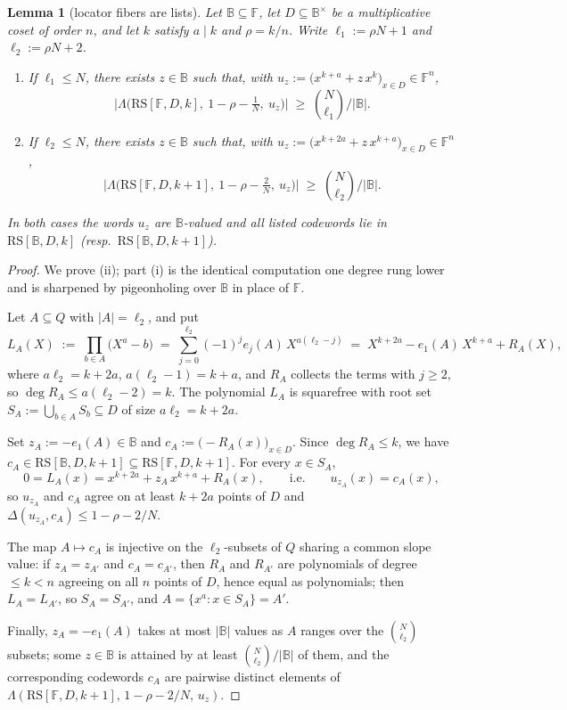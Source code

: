 \documentclass[11pt]{article}
\newtheorem{lemma}[lemma]{Lemma}
\theoremstyle{definition}
\theoremstyle{remark}
\newcommand{\F}{\mathbb{F}}
\newcommand{\B}{\mathbb{B}}
\newcommand{\RS}{\mathrm{RS}}
\newcommand{\dist}{\Delta}
\newcommand{\Lst}{\Lambda}
\begin{document}
\begin{lemma}[locator fibers are lists]\label{lem:fiber}
Let $\B\subseteq\F$, let $D\subseteq\B^\times$ be a multiplicative coset of order $n$, and let $k$ satisfy $a\mid k$ and $\rho=k/n$. Write $\ell_1:=\rho N+1$ and $\ell_2:=\rho N+2$.
\begin{enumerate}[label=\textup{(\roman*)}]
\item If $\ell_1\le N$, there exists $z\in\B$ such that, with $u_z:=\bigl(x^{k+a}+z\,x^{k}\bigr)_{x\in D}\in\F^n$,
\[
\bigl|\Lst\bigl(\RS[\F,D,k],\ 1-\rho-\tfrac1N,\ u_z\bigr)\bigr|\;\ge\;\binom{N}{\ell_1}\Big/|\B| .
\]
\item If $\ell_2\le N$, there exists $z\in\B$ such that, with $u_z:=\bigl(x^{k+2a}+z\,x^{k+a}\bigr)_{x\in D}\in\F^n$,
\[
\bigl|\Lst\bigl(\RS[\F,D,k+1],\ 1-\rho-\tfrac2N,\ u_z\bigr)\bigr|\;\ge\;\binom{N}{\ell_2}\Big/|\B| .
\]
\end{enumerate}
In both cases the words $u_z$ are $\B$-valued and all listed codewords lie in $\RS[\B,D,k]$ \textup(resp.\ $\RS[\B,D,k+1]$\textup).
\end{lemma}

\begin{proof}
We prove (ii); part (i) is the identical computation one degree rung lower and is \cite[Main Thm.\,(d)]{Cho26a} sharpened by pigeonholing over $\B$ in place of $\F$.

Let $A\subseteq Q$ with $|A|=\ell_2$, and put
\[
L_A(X)\;:=\;\prod_{b\in A}\bigl(X^a-b\bigr)\;=\;\sum_{j=0}^{\ell_2}(-1)^j e_j(A)\,X^{a(\ell_2-j)}\;=\;X^{k+2a}-e_1(A)\,X^{k+a}+R_A(X),
\]
where $a\ell_2=k+2a$, $a(\ell_2-1)=k+a$, and $R_A$ collects the terms with $j\ge2$, so $\deg R_A\le a(\ell_2-2)=k$. The polynomial $L_A$ is squarefree with root set $S_A:=\bigcup_{b\in A}S_b\subseteq D$ of size $a\ell_2=k+2a$.

Set $z_A:=-e_1(A)\in\B$ and $c_A:=\bigl(-R_A(x)\bigr)_{x\in D}$. Since $\deg R_A\le k$, we have $c_A\in\RS[\B,D,k+1]\subseteq\RS[\F,D,k+1]$. For every $x\in S_A$,
\[
0=L_A(x)=x^{k+2a}+z_A\,x^{k+a}+R_A(x),\qquad\text{i.e.}\qquad u_{z_A}(x)=c_A(x),
\]
so $u_{z_A}$ and $c_A$ agree on at least $k+2a$ points of $D$ and $\dist(u_{z_A},c_A)\le1-\rho-2/N$.

The map $A\mapsto c_A$ is injective on the $\ell_2$-subsets of $Q$ sharing a common slope value: if $z_A=z_{A'}$ and $c_A=c_{A'}$, then $R_A$ and $R_{A'}$ are polynomials of degree $\le k<n$ agreeing on all $n$ points of $D$, hence equal as polynomials; then $L_A=L_{A'}$, so $S_A=S_{A'}$, and $A=\{x^a:x\in S_A\}=A'$.

Finally, $z_A=-e_1(A)$ takes at most $|\B|$ values as $A$ ranges over the $\binom{N}{\ell_2}$ subsets; some $z\in\B$ is attained by at least $\binom{N}{\ell_2}/|\B|$ of them, and the corresponding codewords $c_A$ are pairwise distinct elements of $\Lst(\RS[\F,D,k+1],\,1-\rho-2/N,\,u_z)$.
\end{proof}
\end{document}
